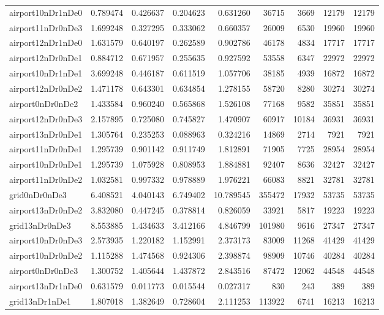 \begin{longtable}{|l|r|r|r|r|r|r|r|r|}
airport10nDr1nDe0 & 0.789474 & 0.426637 & 0.204623 & 0.631260 & 36715 & 3669 & 12179 & 12179 \\
airport11nDr0nDe3 & 1.699248 & 0.327295 & 0.333062 & 0.660357 & 26009 & 6530 & 19960 & 19960 \\
airport12nDr1nDe0 & 1.631579 & 0.640197 & 0.262589 & 0.902786 & 46178 & 4834 & 17717 & 17717 \\
airport12nDr0nDe1 & 0.884712 & 0.671957 & 0.255635 & 0.927592 & 53558 & 6347 & 22972 & 22972 \\
airport10nDr1nDe1 & 3.699248 & 0.446187 & 0.611519 & 1.057706 & 38185 & 4939 & 16872 & 16872 \\
airport12nDr0nDe2 & 1.471178 & 0.643301 & 0.634854 & 1.278155 & 58720 & 8280 & 30274 & 30274 \\
airport0nDr0nDe2 & 1.433584 & 0.960240 & 0.565868 & 1.526108 & 77168 & 9582 & 35851 & 35851 \\
airport12nDr0nDe3 & 2.157895 & 0.725080 & 0.745827 & 1.470907 & 60917 & 10184 & 36931 & 36931 \\
airport13nDr0nDe1 & 1.305764 & 0.235253 & 0.088963 & 0.324216 & 14869 & 2714 & 7921 & 7921 \\
airport11nDr0nDe1 & 1.295739 & 0.901142 & 0.911749 & 1.812891 & 71905 & 7725 & 28954 & 28954 \\
airport10nDr0nDe1 & 1.295739 & 1.075928 & 0.808953 & 1.884881 & 92407 & 8636 & 32427 & 32427 \\
airport11nDr0nDe2 & 1.032581 & 0.997332 & 0.978889 & 1.976221 & 66083 & 8821 & 32781 & 32781 \\
grid0nDr0nDe3 & 6.408521 & 4.040143 & 6.749402 & 10.789545 & 355472 & 17932 & 53735 & 53735 \\
airport13nDr0nDe2 & 3.832080 & 0.447245 & 0.378814 & 0.826059 & 33921 & 5817 & 19223 & 19223 \\
grid13nDr0nDe3 & 8.553885 & 1.434633 & 3.412166 & 4.846799 & 101980 & 9616 & 27347 & 27347 \\
airport10nDr0nDe3 & 2.573935 & 1.220182 & 1.152991 & 2.373173 & 83009 & 11268 & 41429 & 41429 \\
airport10nDr0nDe2 & 1.115288 & 1.474568 & 0.924306 & 2.398874 & 98909 & 10746 & 40284 & 40284 \\
airport0nDr0nDe3 & 1.300752 & 1.405644 & 1.437872 & 2.843516 & 87472 & 12062 & 44548 & 44548 \\
airport13nDr1nDe0 & 0.631579 & 0.011773 & 0.015544 & 0.027317 & 830 & 243 & 389 & 389 \\
grid13nDr1nDe1 & 1.807018 & 1.382649 & 0.728604 & 2.111253 & 113922 & 6741 & 16213 & 16213 \\

\end{longtable}
